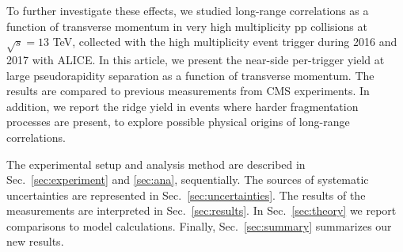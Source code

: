 % 

To further investigate these effects, we studied long-range correlations as a function of transverse momentum in very high multiplicity pp collisions at $\sqrt{s} =13$ TeV, collected with the high multiplicity event trigger during 2016 and 2017 with ALICE. In this article, we present the near-side per-trigger yield at large pseudorapidity separation as a function of transverse momentum. The results are compared to previous measurements from CMS experiments. In addition, we report the ridge yield in events where harder fragmentation processes are present, to explore possible physical origins of long-range correlations.


The experimental setup and analysis method are described in Sec.~\ref{sec:experiment} and \ref{sec:ana}, sequentially.  The sources of systematic uncertainties are represented in Sec.~\ref{sec:uncertainties}. The results of the measurements are interpreted in Sec.~\ref{sec:results}. In Sec.~\ref{sec:theory} we report comparisons to model calculations.
Finally, Sec.~\ref{sec:summary} summarizes our new results.

